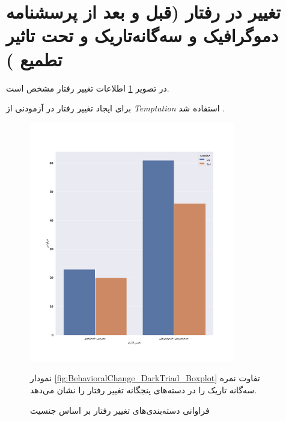 \section{تغییر در رفتار
  \!(قبل و بعد از پرسشنامه دموگرافیک و سه‌گانه‌تاریک و تحت تاثیر تطمیع
  )}

در
تصویر \ref{fig:FrequencyBehaviorPhoneNumber}
اطلاعات تغییر رفتار
مشخص است.

برای ایجاد تغییر رفتار در آزمودنی از
\!\textit{
    \gls{Temptation}
}
استفاده شد
\citep{maihaniemiCompetitionLawBig2020}.
\begin{figure}[htpb]
    \centering
    \includegraphics[width=0.8\textwidth]{./img/FrequencyBehaviorPhoneNumber.png}
    \caption{فراوانی دسته‌بندی‌های تغییر رفتار بر اساس جنسیت}
    \label{fig:FrequencyBehaviorPhoneNumber}
    نمودار
    \ref{fig:BehavioralChange_DarkTriad_Boxplot}
    تفاوت نمره سه‌گانه تاریک را در دسته‌های پنجگانه تغییر رفتار  را نشان می‌دهد.


\end{figure}
